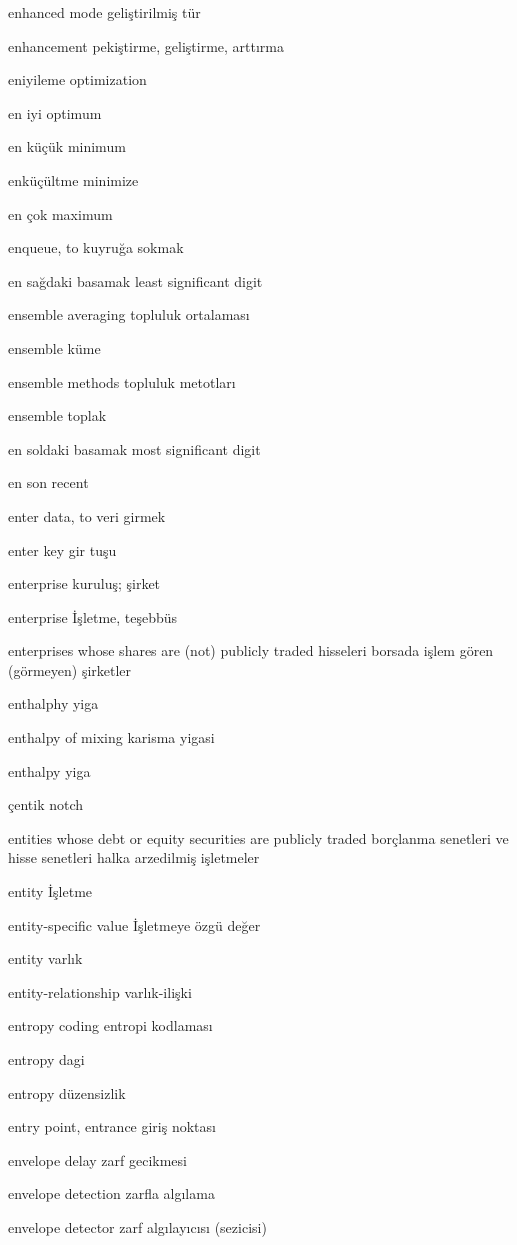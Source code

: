 \documentclass[12pt,fleqn]{article}\usepackage{../../common}
\begin{document}
enhanced mode geliştirilmiş tür

enhancement pekiştirme, geliştirme, arttırma

eniyileme optimization

en iyi optimum

en küçük minimum

enküçültme minimize

en çok maximum

enqueue, to kuyruğa sokmak

en sağdaki basamak least significant digit

ensemble averaging topluluk ortalaması

ensemble küme

ensemble methods topluluk metotları

ensemble toplak

en soldaki basamak most significant digit

en son recent

enter data, to veri girmek

enter key gir tuşu

enterprise kuruluş; şirket

enterprise İşletme, teşebbüs

enterprises whose shares are (not) publicly traded hisseleri borsada işlem gören (görmeyen) şirketler

enthalphy yiga

enthalpy of mixing karisma yigasi

enthalpy yiga

çentik notch

entities whose debt or equity securities are publicly traded borçlanma senetleri ve hisse senetleri halka arzedilmiş işletmeler

entity İşletme

entity-specific value İşletmeye özgü değer

entity varlık

entity-relationship varlık-ilişki

entropy coding entropi kodlaması

entropy dagi

entropy düzensizlik

entry point, entrance giriş noktası

envelope delay zarf gecikmesi

envelope detection zarfla algılama

envelope detector zarf algılayıcısı (sezicisi)
\end{document}
